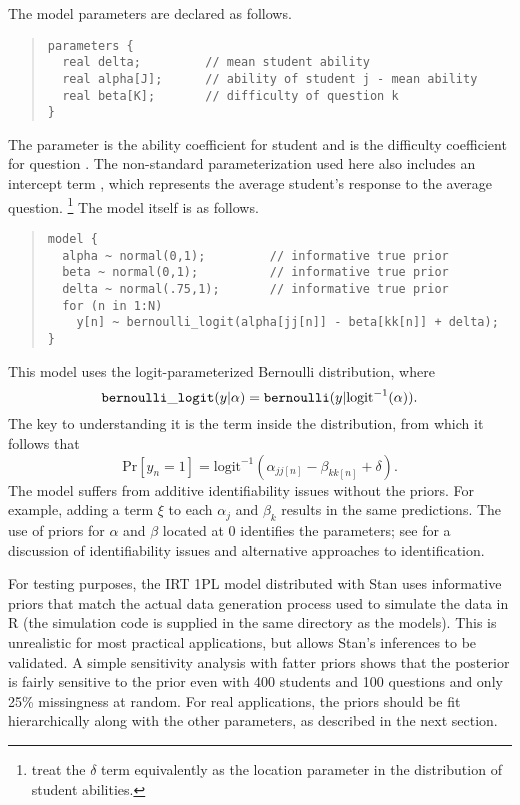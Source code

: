 The model parameters are declared as follows.
%
\begin{quote}
\begin{Verbatim}[fontsize=\small]
parameters {    
  real delta;         // mean student ability
  real alpha[J];      // ability of student j - mean ability
  real beta[K];       // difficulty of question k
}
\end{Verbatim}
\end{quote}
%
The parameter  is the ability coefficient for student
 and  is the difficulty coefficient for question
.  The non-standard parameterization used here also includes
an intercept term , which represents the average student's
response to the average question.%
%
\footnote{\citep{GelmanHill:2007} treat the $\delta$ term equivalently
  as the location parameter in the distribution of student abilities.}
%
The model itself is as follows.
%
\begin{quote}
\begin{Verbatim}[fontsize=\small]
model {
  alpha ~ normal(0,1);         // informative true prior
  beta ~ normal(0,1);          // informative true prior
  delta ~ normal(.75,1);       // informative true prior
  for (n in 1:N)
    y[n] ~ bernoulli_logit(alpha[jj[n]] - beta[kk[n]] + delta);
}
\end{Verbatim}
\end{quote}
%
This model uses the logit-parameterized Bernoulli distribution, where
\[
{\tt bernoulli\_logit}(y|\alpha) =
{\tt bernoulli}(y|\mbox{logit}^{-1}(\alpha)).
\]
%
The key to understanding it is the term inside the
 distribution, from which it follows that
\[
\mbox{Pr}[y_n = 1] = \mbox{logit}^{-1}(\alpha_{jj[n]} - \beta_{kk[n]}
+ \delta).
\]
%
The model suffers from additive identifiability issues without the
priors.  For example, adding a term $\xi$ to each $\alpha_j$ and
$\beta_k$ results in the same predictions.  The use of priors for
$\alpha$ and $\beta$ located at 0 identifies the parameters; see
\citep{GelmanHill:2007} for a discussion of identifiability issues and
alternative approaches to identification.  

For testing purposes, the IRT 1PL model distributed with Stan uses
informative priors that match the actual data generation process used
to simulate the data in R (the simulation code is supplied in the same
directory as the models).  This is unrealistic for most practical
applications, but allows Stan's inferences to be validated.  A simple
sensitivity analysis with fatter priors shows that the posterior is
fairly sensitive to the prior even with 400 students and 100 questions
and only 25\% missingness at random.  For real applications, the
priors should be fit hierarchically along with the other parameters,
as described in the next section.


